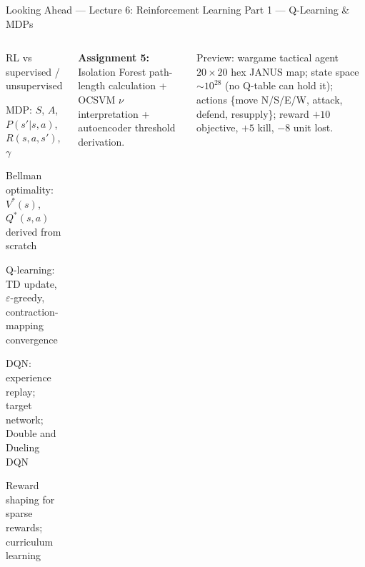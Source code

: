\documentclass[aspectratio=169,10pt,t]{beamer}
\begin{document}
\begin{frame}{Looking Ahead --- Lecture 6: Reinforcement Learning Part 1 --- Q-Learning \& MDPs}
\begin{columns}[T]
\begin{tl}\item RL vs supervised / unsupervised\item MDP: $S$, $A$, $P(s'|s,a)$, $R(s,a,s')$, $\gamma$\item Bellman optimality: $V^*(s)$, $Q^*(s,a)$ derived from scratch\item Q-learning: TD update, $\varepsilon$-greedy, contraction-mapping convergence\item DQN: experience replay; target network; Double and Dueling DQN\item Reward shaping for sparse rewards; curriculum learning\end{tl}
\begin{ibox}\scriptsize\textbf{Assignment 5:} Isolation Forest path-length calculation + OCSVM $\nu$ interpretation + autoencoder threshold derivation.\end{ibox}
\begin{cbox}{Preview: wargame tactical agent}\scriptsize $20\times20$ hex JANUS map; state space $\sim10^{28}$ (no Q-table can hold it); actions \{move N/S/E/W, attack, defend, resupply\}; reward $+10$ objective, $+5$ kill, $-8$ unit lost.\end{cbox}
\end{columns}
\end{frame}
\end{document}
